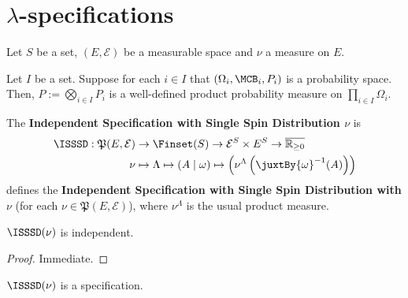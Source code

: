 \section{\texorpdfstring{$\lambda$}{Lambda}-specifications}

Let $S$ be a set, $(E, \mathcal{E})$ be a measurable space and $\nu$ a measure on $E$.

\begin{definition}
    \label{def:product-probability-measure}
    \leanok{}

    Let $I$ be a set. Suppose for each $i\in I$ that $(\Omega_i,\MCB_i,P_i)$ is a probability space. Then, $P:=\bigotimes_{i\in I}P_i$ is a well-defined product probability measure on $\prod_{i\in I}\Omega_i$.
\end{definition}

\begin{definition}
    \label{def:isssd}
    \leanok

    The \textbf{Independent Specification with Single Spin Distribution $\nu$} is
    \begin{align}
        \ISSSD:\mathfrak{P}(E, \mathcal{E})&\to\Finset(S)\to\mathcal{E}^S\times E^S\to\overline{\mathbb{R}_{\geq0}}\\
        \nu&\mapsto\Lambda\mapsto(A\mid\omega)\mapsto\left(\nu^\Lambda\left(\juxtBy{\omega}^{-1}(A)\right)\right)
    \end{align}
    defines the \textbf{Independent Specification with Single Spin Distribution with $\nu$} (for each $\nu\in\mathfrak{P}(E, \mathcal{E})$), where $\nu^\Lambda$ is the usual product measure.
\end{definition}

\begin{lemma}
    \label{lem:isssd-indep}
    \leanok{}

    $\ISSSD(\nu)$ is independent.
\end{lemma}
\begin{proof}
    \leanok

  Immediate.
\end{proof}


\begin{definition}
    \label{def:isssd-spec}
    \leanok

    $\ISSSD(\nu)$ is a specification.
\end{definition}


